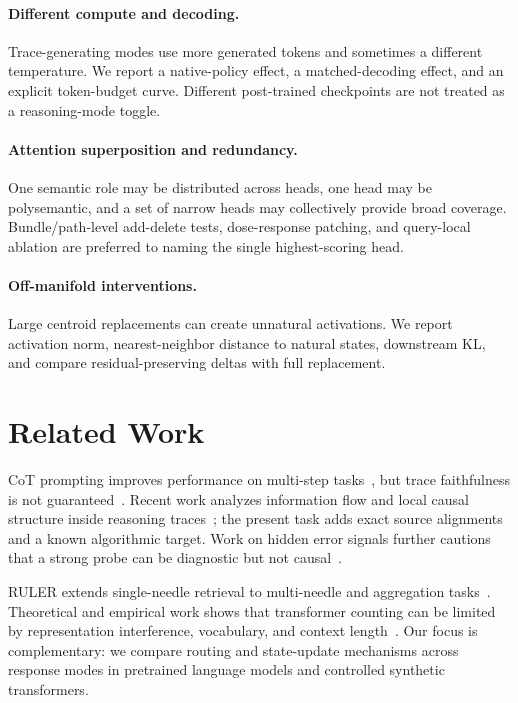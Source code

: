 \documentclass[11pt]{article}
\begin{document}
\paragraph{Different compute and decoding.}
Trace-generating modes use more generated tokens and sometimes a different temperature. We report a native-policy effect, a matched-decoding effect, and an explicit token-budget curve. Different post-trained checkpoints are not treated as a reasoning-mode toggle.

\paragraph{Attention superposition and redundancy.}
One semantic role may be distributed across heads, one head may be polysemantic, and a set of narrow heads may collectively provide broad coverage. Bundle/path-level add-delete tests, dose-response patching, and query-local ablation are preferred to naming the single highest-scoring head.

\paragraph{Off-manifold interventions.}
Large centroid replacements can create unnatural activations. We report activation norm, nearest-neighbor distance to natural states, downstream KL, and compare residual-preserving deltas with full replacement.

\section{Related Work}

CoT prompting improves performance on multi-step tasks~\citep{wei2022cot}, but trace faithfulness is not guaranteed~\citep{turpin2023unfaithful}. Recent work analyzes information flow and local causal structure inside reasoning traces~\citep{yang2026howcot,wei2026attricot}; the present task adds exact source alignments and a known algorithmic target. Work on hidden error signals further cautions that a strong probe can be diagnostic but not causal~\citep{yuan2026hidden}.

RULER extends single-needle retrieval to multi-needle and aggregation tasks~\citep{hsieh2024ruler}. Theoretical and empirical work shows that transformer counting can be limited by representation interference, vocabulary, and context length~\citep{yehudai2024count}. Our focus is complementary: we compare routing and state-update mechanisms across response modes in pretrained language models and controlled synthetic transformers.
\end{document}
